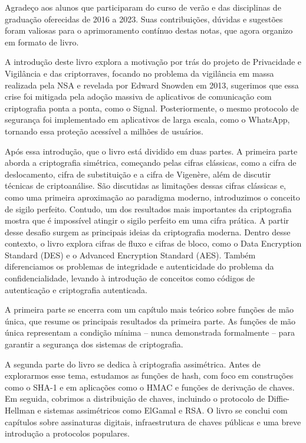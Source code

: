 Agradeço aos alunos que participaram do curso de verão e das disciplinas de graduação oferecidas de 2016 a 2023.
Suas contribuições, dúvidas e sugestões foram valiosas para o aprimoramento contínuo destas notas, que agora organizo em formato de livro.

A introdução deste livro explora a motivação por trás do projeto de Privacidade e Vigilância e das criptorraves, focando no problema da vigilância em massa realizada pela NSA e revelada por Edward Snowden em 2013, sugerimos que essa crise foi mitigada pela adoção massiva de aplicativos de comunicação com criptografia ponta a ponta, como o Signal.
Posteriormente, o mesmo protocolo de segurança foi implementado em aplicativos de larga escala, como o WhatsApp, tornando essa proteção acessível a milhões de usuários.

Após essa introdução, que o livro está dividido em duas partes.
A primeira parte aborda a criptografia simétrica, começando pelas cifras clássicas, como a cifra de deslocamento, cifra de substituição e a cifra de Vigenère, além de discutir técnicas de criptoanálise.
São discutidas as limitações dessas cifras clássicas e, como uma primeira aproximação ao paradigma moderno, introduzimos o conceito de sigilo perfeito.
Contudo, um dos resultados mais importantes da criptografia mostra que é impossível atingir o sigilo perfeito em uma cifra prática.
A partir desse desafio surgem as principais ideias da criptografia moderna.
Dentro desse contexto, o livro explora cifras de fluxo e cifras de bloco, como o Data Encryption Standard (DES) e o Advanced Encryption Standard (AES).
Também diferenciamos os problemas de integridade e autenticidade do problema da confidencialidade, levando à introdução de conceitos como códigos de autenticação e criptografia autenticada.

A primeira parte se encerra com um capítulo mais teórico sobre funções de mão única, que resume os principais resultados da primeira parte.
As funções de mão única representam a condição mínima -- nunca demonstrada formalmente -- para garantir a segurança dos sistemas de criptografia.

A segunda parte do livro se dedica à criptografia assimétrica.
Antes de explorarmos esse tema, estudamos as funções de hash, com foco em construções como o SHA-1 e em aplicações como o HMAC e funções de derivação de chaves.
Em seguida, cobrimos a distribuição de chaves, incluindo o protocolo de Diffie-Hellman e sistemas assimétricos como ElGamal e RSA.
O livro se conclui com capítulos sobre assinaturas digitais, infraestrutura de chaves públicas e uma breve introdução a protocolos populares.

